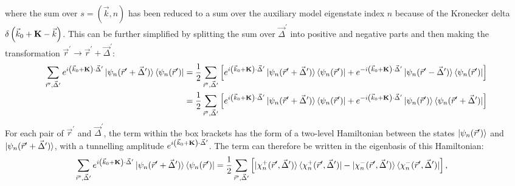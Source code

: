 \documentclass[reprint,hidelinks,onecolumn]{revtex4-2}
\begin{document}
where the sum over \(s=(\vec k, n)\) has been reduced to a sum over the auxiliary model eigenstate index \(n\) because of the Kronecker delta \(\delta\left(\vec k_0 + {\bf K} - \vec k\right)\). This can be further simplified by splitting the sum over \(\vec\Delta^\prime\) into positive and negative parts and then making the transformation \(\vec r^\prime \to \vec r^\prime + \vec \Delta^\prime\):
\begin{equation}\begin{aligned}
	\sum_{\vec r^\prime,\vec \Delta^\prime} e^{i\left( \vec k_0 + {\bf K} \right) \cdot\vec\Delta^\prime}\ket{\psi_n(\vec r^\prime+\vec \Delta^\prime)}\bra{\psi_n(\vec r^\prime)} &= \frac{1}{2}\sum_{\vec r^\prime,\vec \Delta^\prime}\left[ e^{i\left( \vec k_0 + {\bf K} \right) \cdot\vec\Delta^\prime}\ket{\psi_n(\vec r^\prime+\vec \Delta^\prime)}\bra{\psi_n(\vec r^\prime)} + e^{-i\left( \vec k_0 + {\bf K} \right) \cdot\vec\Delta^\prime}\ket{\psi_n(\vec r^\prime-\vec \Delta^\prime)}\bra{\psi_n(\vec r^\prime)}\right] \\
																																												   &= \frac{1}{2}\sum_{\vec r^\prime,\vec \Delta^\prime}\left[ e^{i\left( \vec k_0 + {\bf K} \right) \cdot\vec\Delta^\prime}\ket{\psi_n(\vec r^\prime+\vec \Delta^\prime)}\bra{\psi_n(\vec r^\prime)} + e^{-i\left( \vec k_0 + {\bf K} \right) \cdot\vec\Delta^\prime}\ket{\psi_n(\vec r^\prime)}\bra{\psi_n(\vec r^\prime+\vec \Delta^\prime)}\right] \\
\end{aligned}\end{equation}
For each pair of \(\vec r^\prime\) and \(\vec\Delta^\prime\), the term within the box brackets has the form of a two-level Hamiltonian between the states \(\ket{\psi_n(\vec r^\prime)}\) and \(\ket{\psi_n(\vec r^\prime+\vec \Delta^\prime)}\), with a tunnelling amplitude \(e^{i\left( \vec k_0 + {\bf K} \right) \cdot\vec\Delta^\prime}\). The term can therefore be written in the eigenbasis of this Hamiltonian:
\begin{equation}\begin{aligned}
	\sum_{\vec r^\prime,\vec \Delta^\prime} e^{i\left( \vec k_0 + {\bf K} \right) \cdot\vec\Delta^\prime}\ket{\psi_n(\vec r^\prime+\vec \Delta^\prime)}\bra{\psi_n(\vec r^\prime)} &=\frac{1}{2}\sum_{\vec r^\prime,\vec \Delta^\prime}\left[ \ket{\chi_n^+(\vec r^\prime,\vec\Delta^\prime)}\bra{\chi_n^+(\vec r^\prime,\vec\Delta^\prime)} - \ket{\chi_n^-(\vec r^\prime,\vec\Delta^\prime)}\bra{\chi_n^-(\vec r^\prime,\vec\Delta^\prime)}\right],
\end{aligned}\end{equation}
\end{document}
